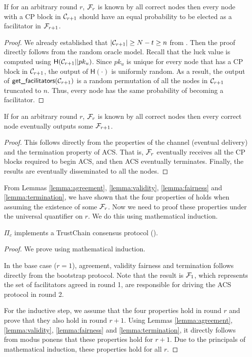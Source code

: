 \begin{lemma}
\label{lemma:fairness}
If for an arbitrary round $r$,
$\mathcal{F}_r$ is known by all correct nodes then
every node with a CP block in $\mathcal{C}_{r+1}$ should have an equal probability to be elected as a facilitator in $\mathcal{F}_{r+1}$.
\end{lemma}
\begin{proof}
We already established that $|\mathcal{C}_{r+1}| \ge N - t \ge n$ from .
Then the proof directly follows from the random oracle model.
Recall that the luck value is computed using $\textsf{H}(\mathcal{C}_{r+1} || pk_u)$.
Since $pk_u$ is unique for every node that has a CP block in $\mathcal{C}_{r+1}$,
the output of $\textsf{H}(\cdot)$ is uniformly random.
As a result, the output of $\textsf{get\_facilitators}(\mathcal{C}_{r+1})$ is a random permutation of all the nodes in $\mathcal{C}_{r+1}$ truncated to $n$.
Thus, every node has the same probability of becoming a facilitator.
\end{proof}

\begin{lemma}
\label{lemma:termination}
If for an arbitrary round $r$,
$\mathcal{F}_r$ is known by all correct nodes then
every correct node eventually outputs some $\mathcal{F}_{r + 1}$.
\end{lemma}
\begin{proof}
This follows directly from the properties of the channel (eventual delivery)
and the termination property of ACS.
That is, $\mathcal{F}_r$ eventually receives all the CP blocks required to begin ACS,
and then ACS eventually terminates.
Finally, the results are eventually disseminated to all the nodes.
\end{proof}

From Lemmas \ref{lemma:agreement}, \ref{lemma:validity}, \ref{lemma:fairness} and \ref{lemma:termination},
we have shown that the four properties of  holds when assuming the existence of some $\mathcal{F}_r$.
Now we need to proof these properties under the universal quantifier on $r$.
We do this using mathematical induction.

\begin{theorem}
\label{theorem:consensus}
$\Pi_c$ implements a TrustChain consensus protocol ().
\end{theorem}
\begin{proof}
We prove using mathematical induction.

In the base case ($r = 1$), agreement, validity fairness and termination follows directly from the bootstrap protocol.
Note that the result is $\mathcal{F}_1$,
which represents the set of facilitators agreed in round 1,
are responsible for driving the ACS protocol in round 2.

For the inductive step,
we assume that the four properties hold in round $r$ and prove that they also hold in round $r + 1$.
Using Lemmas \ref{lemma:agreement}, \ref{lemma:validity}, \ref{lemma:fairness} and \ref{lemma:termination},
it directly follows from modus ponens that these properties hold for $r + 1$.
Due to the principals of mathematical induction, these properties hold for all $r$.
\end{proof}

